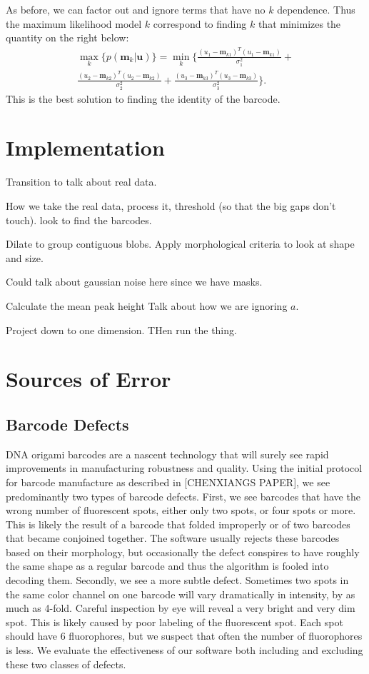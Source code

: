 As before, we can factor out and ignore terms that have no $k$ dependence. Thus the maximum likelihood model $k$ correspond to finding $k$ that minimizes the quantity on the right below:
\begin{multline}
\max_k   \big\{ p(\mathbf{m}_k|\mathbf{u}) \big\} =  \min_k  \Bigg\{  \frac{(u_1-\mathbf{m}_{k1})^T(u_1-\mathbf{m}_{k1})}{\sigma_1^2} +\\  
\frac{(u_2-\mathbf{m}_{k2})^T(u_2-\mathbf{m}_{k2})}{\sigma_2^2} + \frac{(u_3-\mathbf{m}_{k3})^T(u_3-\mathbf{m}_{k3})}{\sigma_3^2} \Bigg\}. 
\end{multline}
This is the best solution to finding the identity of the barcode.

\section{Implementation}
Transition to talk about real data.

How we take the real data, process it, threshold (so that the big gaps don't touch). look to find the barcodes.  

Dilate to group contiguous blobs. Apply morphological criteria to look at shape and size.

Could talk about gaussian noise here since we have masks.

Calculate the mean peak height
Talk about how we are ignoring $a$.

Project  down to one dimension.  THen run the thing.

\section{Sources of Error}



\subsection{Barcode Defects}
DNA origami barcodes are a nascent technology that will surely see rapid improvements in manufacturing robustness and quality. Using the initial protocol for barcode manufacture as described in [CHENXIANGS PAPER], we see predominantly two types of barcode defects. First, we see barcodes that have the wrong number of fluorescent spots, either only two spots, or four spots or more. This is likely the result of a barcode that folded improperly or of two barcodes that became conjoined together. The software usually rejects these barcodes based on their morphology, but occasionally the defect conspires to have roughly the same shape as a regular barcode and thus the algorithm is fooled into decoding them. Secondly, we see a more subtle defect. Sometimes two spots in the same color channel on one barcode will vary dramatically in intensity, by as much as 4-fold. Careful inspection by eye will reveal a very bright and very dim spot. This is likely caused by poor labeling of the fluorescent spot. Each spot should have 6 fluorophores, but we suspect that often the number of fluorophores is less. We evaluate the effectiveness of our software both including and excluding these two classes of defects.    


